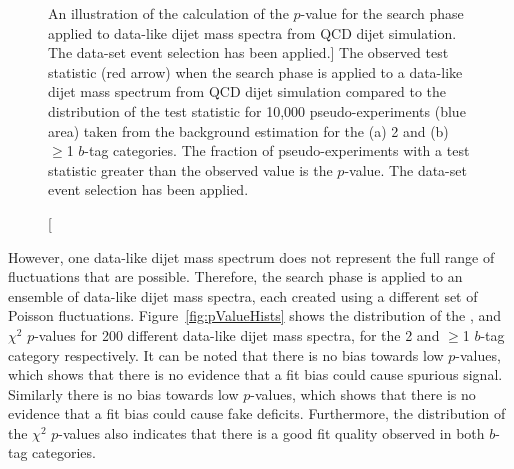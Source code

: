 \begin{figure}[!ht]
\begin{center}
  \end{center}
  \vspace{-1em}
  \caption
      [An illustration of the calculation of the \bh{} $p$-value for the search phase applied to data-like dijet mass spectra from QCD dijet simulation.
        The \summer{} data-set event selection has been applied.]
      {The observed \bh{} test statistic (red arrow) when the search phase is applied to a data-like dijet mass spectrum from QCD dijet simulation
        compared to the distribution of the \bh{} test statistic for 10,000 pseudo-experiments (blue area) taken from the background estimation for
        the (a) 2 and (b) $\geq$1 $b$-tag categories.
        The fraction of pseudo-experiments with a \bh{} test statistic greater than the observed value is the \bh{} \mbox{$p$-value}.
        The \summer{} data-set event selection has been applied.}
  \label{fig:DataLikeStatPlots_bh}
\end{figure}

However, one data-like dijet mass spectrum does not represent the full range of fluctuations that are possible.
Therefore, the search phase is applied to an ensemble of data-like dijet mass spectra,
each created using a different set of Poisson fluctuations.
Figure~\ref{fig:pValueHists}  shows the distribution of
the \bh{}, \dhunt{} and $\chi^{2}$ \mbox{$p$-value}s for 200 different data-like dijet mass spectra,
for the 2 and $\geq$1 $b$-tag category respectively.
It can be noted that there is no bias towards low \bh{} \mbox{$p$-value}s,
which shows that there is no evidence that a fit bias could cause spurious signal.
Similarly there is no bias towards low \dhunt{} \mbox{$p$-value}s,
which shows that there is no evidence that a fit bias could cause fake deficits.
Furthermore, the distribution of the $\chi^{2}$ \mbox{$p$-value}s also indicates that
there is a good fit quality observed in both $b$-tag categories.


